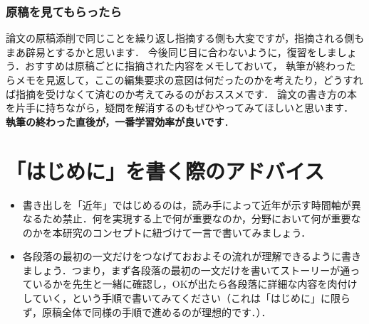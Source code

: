 \subsubsection{原稿を見てもらったら}
論文の原稿添削で同じことを繰り返し指摘する側も大変ですが，指摘される側もまあ辟易とするかと思います．
今後同じ目に合わないように，復習をしましょう．おすすめは原稿ごとに指摘された内容をメモしておいて，
執筆が終わったらメモを見返して，ここの編集要求の意図は何だったのかを考えたり，どうすれば指摘を受けなくて済むのか考えてみるのがおススメです．
論文の書き方の本を片手に持ちながら，疑問を解消するのもぜひやってみてほしいと思います．
\textbf{執筆の終わった直後が，一番学習効率が良いです}．

\section{「はじめに」を書く際のアドバイス}
\begin{itemize}
    \item 書き出しを「近年」ではじめるのは，読み手によって近年が示す時間軸が異なるため禁止．何を実現する上で何が重要なのか，分野において何が重要なのかを本研究のコンセプトに紐づけて一言で書いてみましょう．
    \item 各段落の最初の一文だけをつなげておおよその流れが理解できるように書きましょう．つまり，まず各段落の最初の一文だけを書いてストーリーが通っているかを先生と一緒に確認し，OKが出たら各段落に詳細な内容を肉付けしていく，という手順で書いてみてください（これは「はじめに」に限らず，原稿全体で同様の手順で進めるのが理想的です．）．
\end{itemize}